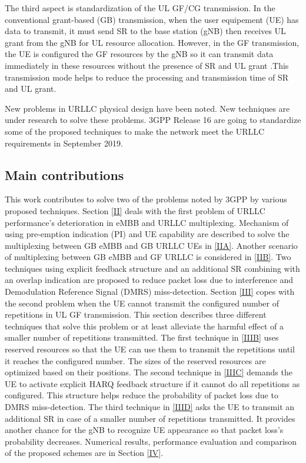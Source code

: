 \documentclass{ieeeaccess}
\begin{document}
The third aspect is standardization of the UL GF/CG transmission. In the conventional grant-based (GB) transmission, when the user equipement (UE) has data to transmit, it must send SR to the base station (gNB) then receives UL grant from the gNB for UL resource allocation. However, in the GF transmission, the UE is configured the GF resources by the gNB so it can transmit data immediately in these resources without the presence of SR and UL grant \cite{ref5}.This transmission mode helps to reduce the processing and transmission time of SR and UL grant. 

New problems in URLLC physical design have been noted. New techniques are under research to solve these problems. 3GPP Release 16 are going to standardize some of the proposed techniques to make the network meet the URLLC requirements in September 2019.

\subsection{Main contributions}

This work contributes to solve two of the problems noted by 3GPP by various proposed techniques. Section \ref{II} deals with the first problem of URLLC performance's deterioration in eMBB and URLLC multiplexing. Mechanism of using pre-emption indication (PI) and UE capability are described to solve the multiplexing between GB eMBB and GB URLLC UEs in \ref{IIA}. Another scenario of multiplexing between GB eMBB and GF URLLC is considered in \ref{IIB}. Two techniques using explicit feedback structure and an additional SR combining with an overlap indication are proposed to reduce packet loss due to interference and Demodulation Reference Signal (DMRS) miss-detection. Section \ref{III} copes with the second problem when the UE cannot transmit the configured number of repetitions in UL GF transmission. This section describes three different techniques that solve this problem or at least alleviate the harmful effect of a smaller number of repetitions transmitted. The first technique in \ref{IIIB} uses reserved resources so that the UE can use them to transmit the repetitions until it reaches the configured number. The sizes of the reserved resources are optimized based on their positions. The second technique in \ref{IIIC} demands the UE to activate explicit HARQ feedback structure if it cannot do all repetitions as configured. This structure helps reduce the probability of packet loss due to DMRS miss-detection. The third technique in \ref{IIID} asks the UE to transmit an additional SR in case of a smaller number of repetitions transmitted. It provides another chance for the gNB to recognize UE appearance so that packet loss's probability decreases. Numerical results, performance evaluation and comparison of the proposed schemes are in Section \ref{IV}.
\end{document}
